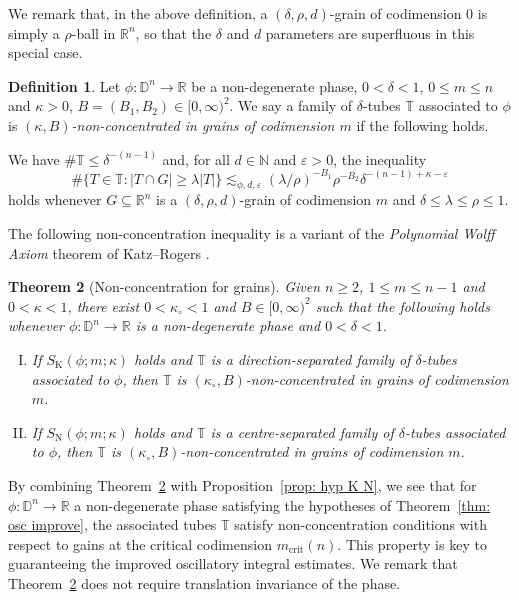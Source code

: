 \documentclass[reqno]{amsart}
\numberwithin{equation}{section}
\newcommand{\D}{\mathbb{D}}
\newcommand{\N}{\mathbb{N}}
\newcommand{\R}{\mathbb{R}}
\newcommand{\T}{\mathbb{T}}
\theoremstyle{plain}
\newtheorem{theorem}{Theorem}[section]
\theoremstyle{definition}
\newtheorem{definition}[theorem]{Definition}
\newcommand{\tK}{\mathrm{K}}
\newcommand{\tN}{\mathrm{N}}
\newcommand{\crit}{\mathrm{crit}}
\begin{document}
We remark that, in the above definition, a $(\delta, \rho, d)$-grain of codimension $0$ is simply a $\rho$-ball in $\R^n$, so that the $\delta$ and $d$ parameters are superfluous in this special case. 

\begin{definition}\label{dfn: non-concentrated} Let $\phi \colon \D^n \to \R$ be a non-degenerate phase, $0 < \delta < 1$, $0 \leq m \leq n$ and $\kappa > 0$, $B = (B_1, B_2) \in [0, \infty)^2$. We say a family of $\delta$-tubes $\T$ associated to $\phi$ is \textit{$(\kappa, B)$-non-concentrated in grains of codimension $m$} if the following holds.\medskip

\noindent We have $\#\T \leq \delta^{-(n-1)}$ and, for all $d \in \N$ and $\varepsilon > 0$, the inequality
    \begin{equation}\label{eq: non-concentration}
        \#\big\{ T \in \T : |T \cap G| \geq \lambda |T| \big\} \lesssim_{\phi, d, \varepsilon} (\lambda/\rho)^{-B_1} \rho^{-B_2} \delta^{-(n-1) + \kappa - \varepsilon}
    \end{equation}
    holds whenever $G \subseteq \R^n$ is a $(\delta, \rho, d)$-grain of codimension $m$ and $\delta \leq \lambda \leq \rho \leq 1$.
\end{definition}


The following non-concentration inequality is a variant of the \textit{Polynomial Wolff Axiom} theorem of Katz--Rogers \cite{KR2018}. 

\begin{theorem}[Non-concentration for grains]\label{thm: non-concentration} Given $n \geq 2$, $1 \leq m \leq n-1$ and $0 < \kappa < 1$, there exist $ 0 < \kappa_{\circ} < 1$ and $B \in [0, \infty)^2$ such that the following holds whenever $\phi \colon \D^n \to \R$ is a non-degenerate phase and $0 < \delta < 1$. 
\begin{enumerate}[I)]
    \item If $S_{\tK}(\phi; m; \kappa)$ holds and $\T$ is a direction-separated family of $\delta$-tubes associated to $\phi$, then $\T$ is $(\kappa_{\circ}, B)$-non-concentrated in grains of codimension $m$. 
\item  If $S_{\tN}(\phi; m; \kappa)$ holds and $\T$ is a centre-separated family of $\delta$-tubes associated to $\phi$, then $\T$ is $(\kappa_{\circ}, B)$-non-concentrated in grains of codimension $m$.
\end{enumerate}
\end{theorem}

By combining Theorem~\ref{thm: non-concentration} with Proposition~\ref{prop: hyp K N}, we see that for $\phi \colon \D^n \to \R$ a non-degenerate phase satisfying the hypotheses of Theorem~\ref{thm: osc improve}, the associated tubes $\T$ satisfy non-concentration conditions with respect to gains at the critical codimension $m_{\crit}(n)$. This property is key to guaranteeing the improved oscillatory integral estimates. We remark that Theorem~\ref{thm: non-concentration} does not require translation invariance of the phase.
\end{document}
